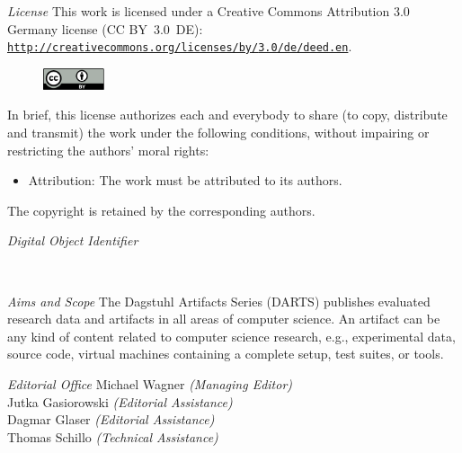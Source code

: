 \documentclass[a4paper,UKenglish]{dartsmaster}
\begin{document}
\begin{publicationinfo}
\bigskip

\emph{License}\newline
This work is licensed under a Creative Commons Attribution 3.0 Germany license (CC BY~3.0~DE): \href{http://creativecommons.org/licenses/by/3.0/de/deed.en}{\nolinkurl{http://creativecommons.org/licenses/by/}}\linebreak \href{http://creativecommons.org/licenses/by/3.0/de/deed.en}{\nolinkurl{3.0/de/deed.en}}.
\begin{figure}
\vspace*{-1\baselineskip}
\includegraphics[width=1.8cm]{cc-by}
\end{figure} 
In brief, this license authorizes each and everybody to share (to
copy, distribute and transmit) the work under the following
conditions, without impairing or restricting the authors'
moral rights:
\begin{itemize}
\item Attribution: The work must be attributed to its authors.
\end{itemize}

The copyright is retained by the corresponding authors.

\vfill
\emph{Digital Object Identifier}\newline
\printForewordDOI

\newpage

~~

\bigskip

\emph{Aims and Scope}\newline
The Dagstuhl Artifacts Series (DARTS) publishes evaluated research data and artifacts in all areas of computer science. An artifact can be any kind of content related to computer science research, e.g., experimental data, source code, virtual machines containing a complete setup, test suites, or tools.



\vfill


\emph{Editorial Office}\newline
Michael Wagner \emph{(Managing Editor)}\\
Jutka Gasiorowski \emph{(Editorial Assistance)}\\
Dagmar Glaser \emph{(Editorial Assistance)}\\
Thomas Schillo \emph{(Technical Assistance)}


\end{publicationinfo}
\end{document}
